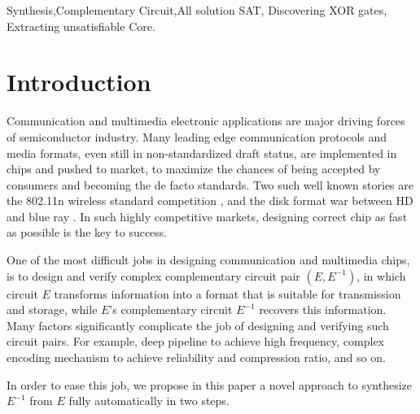 \documentclass[journal]{IEEEtran}
\begin{document}
\begin{IEEEkeywords}
Synthesis,Complementary Circuit,All solution SAT, Discovering XOR gates, Extracting unsatisfiable Core.
\end{IEEEkeywords}






%
\IEEEpeerreviewmaketitle


\newtheorem{algo}{Algorithm}
\newtheorem{definition11}{Definition}
\newtheorem{theorem}{Theorem}

\section{Introduction}
Communication and multimedia electronic applications are major driving forces of semiconductor industry.
Many leading edge communication protocols and media formats,
even still in non-standardized draft status,
are implemented in chips and pushed to market,
to maximize the chances of being accepted by consumers and becoming the de facto standards.
Two such well known stories are the 802.11n wireless standard competition \cite{IEEE80211N},
and the disk format war between HD and blue ray \cite{BRHDVD}.
In such highly competitive markets,
designing correct chip as fast as possible is the key to success.

One of the most difficult jobs in designing communication and multimedia chips,
is to design and verify complex complementary circuit pair $(E,E^{-1})$,
in which circuit $E$ transforms information into a format that is suitable for transmission and storage,
while $E$'s complementary circuit $E^{-1}$ recovers this information.
Many factors significantly complicate the job of designing and verifying such circuit pairs.
For example, deep pipeline to achieve high frequency,
complex encoding mechanism to achieve reliability and compression ratio, and so on.

In order to ease this job,
we propose in this paper a novel approach to synthesize $E^{-1}$ from $E$ fully automatically in two steps.
\end{document}
